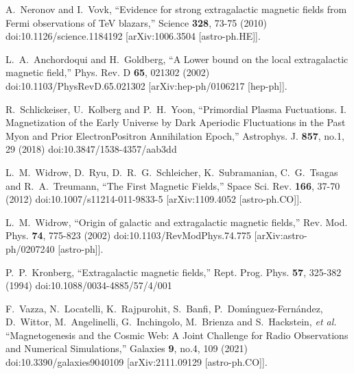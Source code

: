 \documentclass[universe,article,submit,moreauthors,pdftex,a4paper]{Definitions/mdpi}
\begin{document}
\begin{thebibliography}{99}
A.~Neronov and I.~Vovk,
``Evidence for strong extragalactic magnetic fields from Fermi observations of TeV blazars,''
Science \textbf{328}, 73-75 (2010)
doi:10.1126/science.1184192
[arXiv:1006.3504 [astro-ph.HE]].

L.~A.~Anchordoqui and H.~Goldberg,
``A Lower bound on the local extragalactic magnetic field,''
Phys. Rev. D \textbf{65}, 021302 (2002)
doi:10.1103/PhysRevD.65.021302
[arXiv:hep-ph/0106217 [hep-ph]].

R.~Schlickeiser, U.~Kolberg and P.~H.~Yoon,
``Primordial Plasma Fuctuations. I. Magnetization of the Early Universe by Dark Aperiodic Fluctuations in the Past Myon and Prior Electron\textendash{}Positron Annihilation Epoch,''
Astrophys. J. \textbf{857}, no.1, 29 (2018)
doi:10.3847/1538-4357/aab3dd

L.~M.~Widrow, D.~Ryu, D.~R.~G.~Schleicher, K.~Subramanian, C.~G.~Tsagas and R.~A.~Treumann,
``The First Magnetic Fields,''
Space Sci. Rev. \textbf{166}, 37-70 (2012)
doi:10.1007/s11214-011-9833-5
[arXiv:1109.4052 [astro-ph.CO]].

L.~M.~Widrow,
``Origin of galactic and extragalactic magnetic fields,''
Rev. Mod. Phys. \textbf{74}, 775-823 (2002)
doi:10.1103/RevModPhys.74.775
[arXiv:astro-ph/0207240 [astro-ph]].

P.~P.~Kronberg,
``Extragalactic magnetic fields,''
Rept. Prog. Phys. \textbf{57}, 325-382 (1994)
doi:10.1088/0034-4885/57/4/001

F.~Vazza, N.~Locatelli, K.~Rajpurohit, S.~Banfi, P.~Dom\'\i{}nguez-Fern\'andez, D.~Wittor, M.~Angelinelli, G.~Inchingolo, M.~Brienza and S.~Hackstein, \textit{et al.}
``Magnetogenesis and the Cosmic Web: A Joint Challenge for Radio Observations and Numerical Simulations,''
Galaxies \textbf{9}, no.4, 109 (2021)
doi:10.3390/galaxies9040109
[arXiv:2111.09129 [astro-ph.CO]].


\end{thebibliography}
\end{document}
